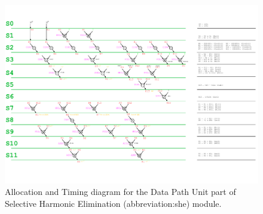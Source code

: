 \documentclass[a4paper, twoside, 11pt]{article}
\begin{document}
            \begin{figure}[htbp!]
                \centering
                \includegraphics[width=1\textwidth]{src/pdf/she-allocation-timing.pdf}
                           \caption{Allocation and Timing diagram for the Data Path Unit part of Selective Harmonic Elimination (\gls{abbreviation:she}) module.}
                \label{fig:she-allocation-timing}
            \end{figure}

    \FloatBarrier
\end{document}
